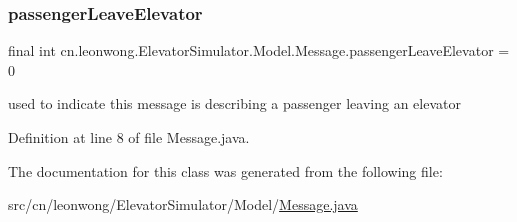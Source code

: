 \mbox{\label{classcn_1_1leonwong_1_1_elevator_simulator_1_1_model_1_1_message_a8ff9f9824b15bd10efe3770f39a136dc}} 
\subsubsection{\texorpdfstring{passenger\+Leave\+Elevator}{passengerLeaveElevator}}
{\footnotesize\ttfamily final int cn.\+leonwong.\+Elevator\+Simulator.\+Model.\+Message.\+passenger\+Leave\+Elevator = 0\hspace{0.3cm}{\ttfamily [static]}}



used to indicate this message is describing a passenger leaving an elevator 



Definition at line 8 of file Message.\+java.



The documentation for this class was generated from the following file\+:\begin{DoxyCompactItemize}
\item 
src/cn/leonwong/\+Elevator\+Simulator/\+Model/\hyperlink{_message_8java}{Message.\+java}\end{DoxyCompactItemize}
